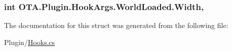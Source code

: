 \subsubsection[{Width}]{\setlength{\rightskip}{0pt plus 5cm}int O\+T\+A.\+Plugin.\+Hook\+Args.\+World\+Loaded.\+Width\hspace{0.3cm}{\ttfamily [get]}, {\ttfamily [set]}}\label{struct_o_t_a_1_1_plugin_1_1_hook_args_1_1_world_loaded_ade0f32d7e15bf115ac241277d69b4e4a}


The documentation for this struct was generated from the following file\+:\begin{DoxyCompactItemize}
\item 
Plugin/\hyperlink{_hooks_8cs}{Hooks.\+cs}\end{DoxyCompactItemize}
